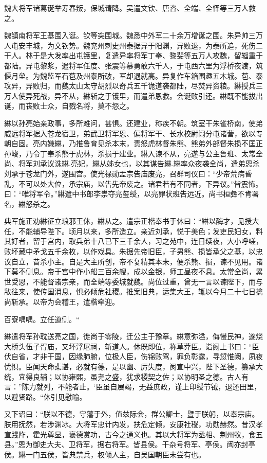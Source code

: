 \documentclass[12pt,UTF8]{ctexbook}
\begin{document}
魏大将军诸葛诞举寿春叛，保城请降。吴遣文钦、唐咨、全端、全怿等三万人救之。

魏镇南将军王基围入诞。钦等突围城。魏悉中外军二十余万增诞之围。朱异帅三万人屯安丰城，为文钦势。魏兖州刺史州泰据异于阳渊，异败退，为泰所追，死伤二干人。林于是大发率出屯镬里，复遣异率将军丁奉、黎斐等五万人攻魏，留辎重于都陆。异屯黎浆，遣将军任度、张震等慕勇敢六千人，于屯西六里为浮桥夜渡，筑偃月垒。为魏监军石苞及州泰所破，军却退就高。异复作车箱围趣五木城。苞、泰攻异，异败归，而魏太山太守胡烈以奇兵五千诡道袭都陆，尽焚异资粮。綝授兵三万人使异死战，异不从，綝斩之于镬里，而遣弟恩救。会诞败引还。綝既不能拔出诞，而丧败士众，自戮名将，莫不怨之。

綝以孙亮始亲政事，多所难问，甚惧。还建业，称疾不朝。筑室干朱雀桥南，使弟威远将军据入苍龙宿卫，弟武卫将军恩、偏将军干、长水校尉闿分屯诸营，欲以专朝自固。亮内嫌綝，乃推鲁育见杀本末，责怒虎林督朱熊、熊弟外部督朱损不匡正孙峻，乃令丁奉杀熊于虎林，杀损于建业。綝入谏不从，亮遂与公主鲁班、太常全尚、将军刘承议诛綝.亮妃，綝从姊女也，以其谋告綝.綝率众夜袭全尚，遣弟恩杀刘承于苍龙门外，遂围宫。使光禄勋盂宗告庙废亮，召群司仪曰：“少帝荒病昏乱，不可以处大位，承宗庙，以告先帝废之。诸君若有不同者，下异议。”皆震怖。曰：“唯将军令。”綝遣中书郎李祟夺亮玺绶，以亮罪状班告远近。尚书桓彝不肯署名，綝怒杀之。

典军施正劝綝征立琅邪王休，綝从之。遣宗正楷奉书于休曰：“綝以酶才，见授大任，不能辅导陛下。顷月以来，多所造立。亲近刘承，悦于美色；发吏民妇女，料其好者，留于宫内，取兵弟十八已下三千余人，习之苑中，连日续夜，大小呼嗟，败坏藏中矛戈五千余枚，以作戏具。朱据先帝旧臣，子男熊、损皆承父之基，以忠议自立，昔杀小主。自是大主所创，帝不复精其本未，便杀熊、损，谏不见用。诸下莫不侧息。帝于宫中作小船三百余艘，成以金银，师工昼夜不息。太常全尚，累世受恩，不能督诸宗亲，而全端等委城就魏。尚位过重，曾无一言以谏陛下，而与敌往来，使传国消息，惧必倾危社稷。推案旧典，运集大王，辄以今月二十七日擒尚斩承。以帝为会稽王，遣楷牵迎。

百寮喁喁。立任道侧。“

綝遣将军孙耽送亮之国，徙尚于零陵，迁公主于豫章。綝意弥溢，侮慢民神，遂烧大桥头伍子胥庙，又坏浮屠祠，斩道人。休既即位，称草莽臣。诣阙上书曰：“臣伏自省，才非干国，因缘肺腑，位极人臣，伤锦败驾，罪负彰露，寻愆惟阙，夙夜忧惧。臣闻天命棐谌，必就有德，是以幽、厉失度，阂宣中兴，陛下圣德，纂承大统，宜得良辅；以协雍熙，虽尧之盛，犹求稷契之佐；以协明圣之德。古人有言：”陈力就列，不能者止。‘臣虽自展竭，无益庶政，谨上印绶节钺，退还田里，以避贤路。“休引见慰喻。

又下诏曰：“朕以不德，守藩于外，值兹际会，群公卿士，暨于朕躬，以奉宗庙。朕用抚然，若涉渊冰。大将军忠计内发，扶危定倾，安康社稷，功勋赫然。昔汉孝宣践阼，霍光尊显，褒德赏功，古今之通义也。其以大将军为丞相、荆州牧，食五县。”恩为御史大夫、卫将军，据右将军。皆县侯。干杂号将军、亭侯。闿亦封亭侯。綝一门五侯，皆典禁兵，权倾人主，自吴国朝臣未尝有也。
\end{document}
